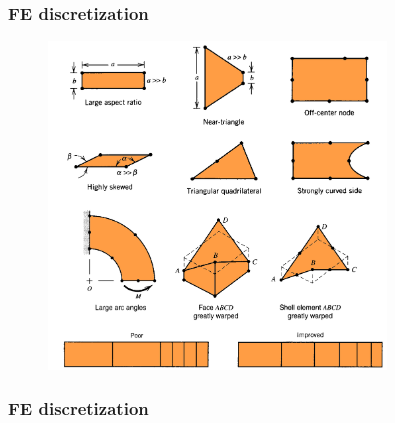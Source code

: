 \documentclass[notes]{beamer}
\begin{document}
\begin{frame}
\frametitle{FE discretization}
\begin{figure}[ht]
	\centering
	\includegraphics[width=0.8\textwidth]{figs/acceptable-discretization.png}
\end{figure}
\end{frame}

\begin{frame}
\frametitle{FE discretization}
\end{frame}
\end{document}
